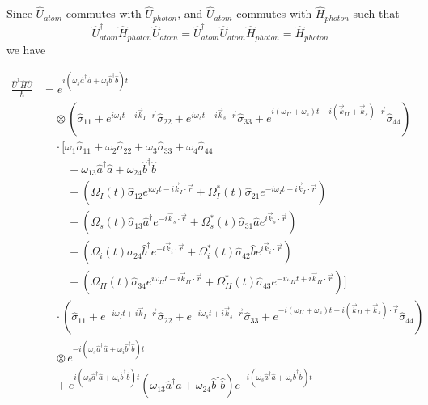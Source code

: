 \documentclass[aps,pra,showpacs,amsmath,amssymb,nofootinbib,longbibliography,superscriptaddress
]{revtex4-1}
\theoremstyle{definition}
\theoremstyle{remark}
\newcommand{\0}{\hat{0}}
\begin{document}
Since $\hat{U}_{atom}$ commutes with $\hat{U}_{photon}$, and $\hat{U}_{atom}$ commutes with $\hat{H}_{photon}$ such that
\begin{equation}
    \hat{U}_{atom}^{\dagger} \hat{H}_{photon} \hat{U}_{atom} = \hat{U}_{atom}^{\dagger} \hat{U}_{atom} \hat{H}_{photon} = \hat{H}_{photon}
\end{equation}
we have

\begin{align}
    \frac{\hat{U}^{\dagger} \hat{H} \hat{U}}{\hbar}
    &= e^{i(\omega_s \hat{a}^{\dagger} \hat{a} + \omega_i \hat{b}^{\dagger} \hat{b})t} \nonumber \\
    &\;\;\;\;\otimes
    \left(\hat{\sigma}_{11} + e^{i \omega_I t - i \vec{k}_I \cdot \vec{r}} \hat{\sigma}_{22} + e^{i \omega_s t - i \vec{k}_s \cdot \vec{r}} \hat{\sigma}_{33} + e^{i(\omega_{II} + \omega_s) t - i(\vec{k}_{II} + \vec{k}_s) \cdot \vec{r}} \hat{\sigma}_{44}\right) \nonumber\\
    &\;\;\;\;\cdot\biggl[
        \omega_1 \hat{\sigma}_{11} + \omega_2 \hat{\sigma}_{22} + \omega_3 \hat{\sigma}_{33} + \omega_4 \hat{\sigma}_{44}\nonumber \\
        &\;\;\;\;\;\;\;\;+ \omega_{13} \hat{a}^{\dagger} \hat{a} + \omega_{24} \hat{b}^{\dagger} \hat{b}\nonumber \\
        &\;\;\;\;\;\;\;\;+ \left(\Omega_{I}(t) \hat{\sigma}_{12} e^{i \omega_I t - i \vec{k}_I \cdot \vec{r}} + \Omega_{I}^*(t) \hat{\sigma}_{21} e^{-i \omega_I t + i \vec{k}_I \cdot \vec{r}}\right)\nonumber \\
        &\;\;\;\;\;\;\;\;+ \left(\Omega_{s}(t) \hat{\sigma}_{13} \hat{a}^{\dagger} e^{-i \vec{k}_{s} \cdot \vec{r}} + \Omega_{s}^*(t) \hat{\sigma}_{31} \hat{a} e^{i \vec{k}_{s} \cdot \vec{r}}\right)\nonumber \\
        &\;\;\;\;\;\;\;\;+ \left(\Omega_{i}(t) \hat{\sigma}_{24} \hat{b}^{\dagger} e^{-i \vec{k}_{i} \cdot \vec{r}} + \Omega_{i}^*(t) \hat{\sigma}_{42} \hat{b} e^{i \vec{k}_{i} \cdot \vec{r}}\right)\nonumber \\
        &\;\;\;\;\;\;\;\;+ \left(\Omega_{II}(t) \hat{\sigma}_{34} e^{i \omega_{II} t - i \vec{k}_{II} \cdot \vec{r}} + \Omega_{II}^*(t) \hat{\sigma}_{43} e^{-i \omega_{II} t + i \vec{k}_{II} \cdot \vec{r}}\right)
    \biggr] \nonumber\\
    &\;\;\;\; \cdot
    \left(\hat{\sigma}_{11} + e^{-i \omega_I t + i \vec{k}_I \cdot \vec{r}} \hat{\sigma}_{22} + e^{-i \omega_s t + i \vec{k}_s \cdot \vec{r}} \hat{\sigma}_{33} + e^{-i(\omega_{II} + \omega_s) t + i(\vec{k}_{II} + \vec{k}_s) \cdot \vec{r}} \hat{\sigma}_{44}\right) \nonumber \\
    &\;\;\;\;\otimes e^{-i(\omega_s \hat{a}^{\dagger} \hat{a} + \omega_i \hat{b}^{\dagger} \hat{b})t} \nonumber \\
    &\;\;\;\;+ e^{i(\omega_s \hat{a}^{\dagger} \hat{a} + \omega_i \hat{b}^{\dagger} \hat{b})t}
    \left(\omega_{13} \hat{a}^{\dagger} \hat{a} + \omega_{24} \hat{b}^{\dagger} \hat{b}\right)
    e^{-i(\omega_s \hat{a}^{\dagger} \hat{a} + \omega_i \hat{b}^{\dagger} \hat{b})t} \nonumber \\
\end{align}
\end{document}
